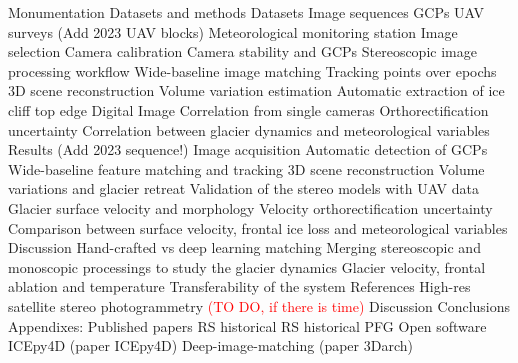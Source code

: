 \documentclass[12pt]{article}
\begin{document}
\begin{outline}[enumerate]
            \3 Monumentation
        \2 Datasets and methods
            \3 Datasets 
                \4 Image sequences
                \4 GCPs
                \4 UAV surveys  {\color{red} (Add 2023 UAV blocks)}
                \4 Meteorological monitoring station        
            \3 Image selection
            \3 Camera calibration
            \3 Camera stability and GCPs
            \3 Stereoscopic image processing workflow
                \4 Wide-baseline image matching
                \4 Tracking points over epochs
                \4 3D scene reconstruction
            \3 Volume variation estimation
            \3 Automatic extraction of ice cliff top edge
            \3 Digital Image Correlation from single cameras    
                \4 Orthorectification uncertainty
            \3 Correlation between glacier dynamics and meteorological variables
        \2 Results {\color{red} (Add 2023 sequence!)}
            \3 Image acquisition
            \3 Automatic detection of GCPs
            \3 Wide-baseline feature matching and tracking
            \3 3D scene reconstruction
            \3 Volume variations and glacier retreat
            \3 Validation of the stereo models with UAV data
            \3 Glacier surface velocity and morphology
            \3 Velocity orthorectification uncertainty
            \3 Comparison between surface velocity, frontal ice loss and meteorological variables
        \2 Discussion
            \3 Hand-crafted vs deep learning matching
            \3 Merging stereoscopic and monoscopic processings to study the glacier dynamics
            \3 Glacier velocity, frontal ablation and temperature 
            \3 Transferability of the system
        \2 References
    \1 High-res satellite stereo photogrammetry  \textcolor{red}{(TO DO, if there is time)}
    \1 Discussion
        \2 
    \1 Conclusions
    \1 Appendixes:
        \2 Published papers 
            \3 RS historical
            \3 RS historical
            \3 PFG
        \2 Open software
            \3 ICEpy4D (paper ICEpy4D)
            \3 Deep-image-matching (paper 3Darch)
    
\end{outline}
\end{document}
